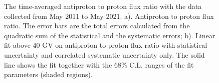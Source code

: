 \begin{figure}[p]
    \centering
    \caption[The time-averaged antiproton to proton flux ratio.]{The time-averaged antiproton to proton flux ratio with the data collected from May 2011 to May 2021. a). Antiproton to proton flux ratio. The error bars are the total errors calculated from the quadratic sum of the statistical and the systematic errors; b). Linear fit above 40 GV on antiproton to proton flux ratio with statistical uncertainty and correlated systematic uncertainty only. The solid line shows the fit together with the 68\% C.L. ranges of the fit parameters (shaded regions).}    
\end{figure}



